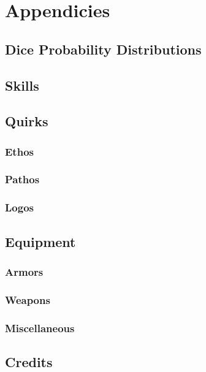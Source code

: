 \documentclass[oneside]{book}
\begin{document}
    \part{Appendicies}
    \begin{appendices}

        \chapter{Dice Probability Distributions}

        \chapter{Skills}

        \chapter{Quirks}
            \section{Ethos}
            \section{Pathos}
            \section{Logos}

        \chapter{Equipment}
            \section{Armors}
            \section{Weapons}
            \section{Miscellaneous}

    \end{appendices}

    \chapter*{Credits}
    
\end{document}
